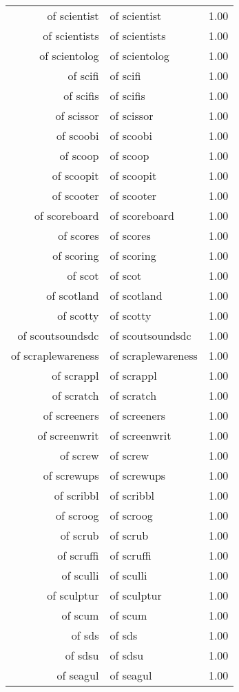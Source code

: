 \begin{table}[ht]
\begin{tabular}{rlr}
  of scientist & of scientist & 1.00 \\ 
  of scientists & of scientists & 1.00 \\ 
  of scientolog & of scientolog & 1.00 \\ 
  of scifi & of scifi & 1.00 \\ 
  of scifis & of scifis & 1.00 \\ 
  of scissor & of scissor & 1.00 \\ 
  of scoobi & of scoobi & 1.00 \\ 
  of scoop & of scoop & 1.00 \\ 
  of scoopit & of scoopit & 1.00 \\ 
  of scooter & of scooter & 1.00 \\ 
  of scoreboard & of scoreboard & 1.00 \\ 
  of scores & of scores & 1.00 \\ 
  of scoring & of scoring & 1.00 \\ 
  of scot & of scot & 1.00 \\ 
  of scotland & of scotland & 1.00 \\ 
  of scotty & of scotty & 1.00 \\ 
  of scoutsoundsdc & of scoutsoundsdc & 1.00 \\ 
  of scraplewareness & of scraplewareness & 1.00 \\ 
  of scrappl & of scrappl & 1.00 \\ 
  of scratch & of scratch & 1.00 \\ 
  of screeners & of screeners & 1.00 \\ 
  of screenwrit & of screenwrit & 1.00 \\ 
  of screw & of screw & 1.00 \\ 
  of screwups & of screwups & 1.00 \\ 
  of scribbl & of scribbl & 1.00 \\ 
  of scroog & of scroog & 1.00 \\ 
  of scrub & of scrub & 1.00 \\ 
  of scruffi & of scruffi & 1.00 \\ 
  of sculli & of sculli & 1.00 \\ 
  of sculptur & of sculptur & 1.00 \\ 
  of scum & of scum & 1.00 \\ 
  of sds & of sds & 1.00 \\ 
  of sdsu & of sdsu & 1.00 \\ 
  of seagul & of seagul & 1.00 \\ 

\end{tabular}
\end{table}
